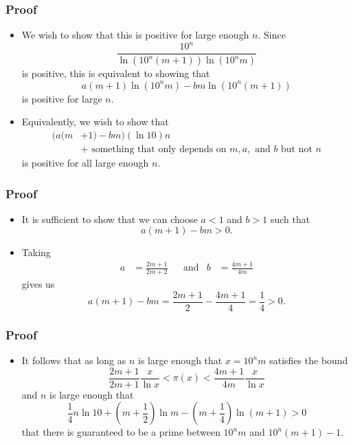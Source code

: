 \documentclass{beamer}
\begin{document}
\begin{frame}
    \frametitle{Proof}

    \begin{itemize}
        \item We wish to show that this is positive for large enough $n$. Since
        \[
            \frac{10^n}{\ln\left( 10^{n} (m + 1) \right) \ln\left( 10^n m \right)}
        \]
        is positive, this is equivalent to showing that
        \[
            a (m + 1) \ln\left( 10^n m \right) - b m \ln\left( 10^{n} (m + 1) \right)
        \]
        is positive for large $n$.
        \pause
        \item Equivalently, we wish to show that
        \begin{align*}
            ( a(m & + 1) - b m ) (\ln 10) n \\
            & + \text{ something that only depends on } m, a, \text{ and } b \text{ but not } n  
        \end{align*}
        is positive for all large enough $n$.
    \end{itemize}

\end{frame}

\begin{frame}
    \frametitle{Proof}

    \begin{itemize}
        \item It is sufficient to show that we can choose $a < 1$ and $b > 1$ such that
        \[
            a(m + 1) - b m > 0.    
        \]
        \pause
        \item Taking
        \begin{align*}
            a & = \frac{2m + 1}{2m + 2} & & \text{and} & b & = \frac{4m + 1}{4m}
        \end{align*}
        gives us
        \[
            a(m + 1) - b m = \frac{2m + 1}{2} - \frac{4m + 1}{4} = \frac{1}{4} > 0.    
        \]
    \end{itemize}

\end{frame}

\begin{frame}
    \frametitle{Proof}

    \begin{itemize}
        \item It follows that as long as $n$ is large enough that $x = 10^n m$ satisfies the bound
        \[
            \frac{2m + 1}{2m + 1} \frac{x}{\ln x} < \pi(x) < \frac{4m + 1}{4m} \frac{x}{\ln x}    
        \]
        and $n$ is large enough that
        \[
            \frac{1}{4} n \ln 10 + \left(m + \frac{1}{2}\right) \ln m - \left(m + \frac{1}{4} \right) \ln(m + 1) > 0
        \]
        that there is guaranteed to be a prime between $10^n m$ and $10^n (m + 1) - 1$.
    \end{itemize}
\end{frame}
\end{document}
